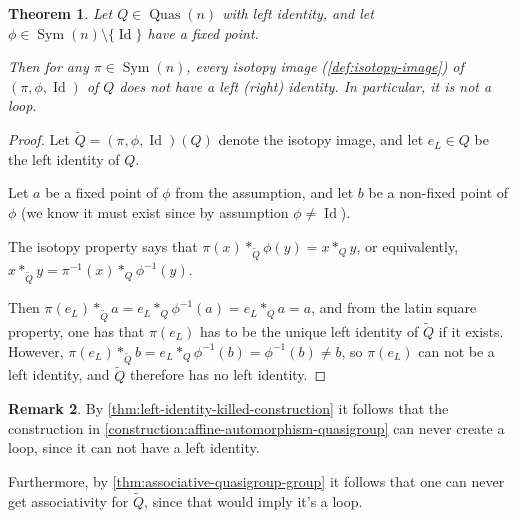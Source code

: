 \documentclass[a4paper, 12pt, english]{article}
\theoremstyle{plain}
\newtheorem{theorem}{Theorem}[section]
\theoremstyle{definition}
\newtheorem{remark}[theorem]{Remark}
\DeclareMathOperator{\Sym}{Sym}
\DeclareMathOperator{\Quas}{Quas}
\DeclareMathOperator{\Id}{Id}
\begin{document}
\begin{theorem} \label{thm:left-identity-killed-construction}
    Let \( Q \in \Quas(n) \) with left identity, and let \( \phi \in \Sym(n) \setminus \{\Id\} \) have a fixed point.

    Then for any \( \pi \in \Sym(n) \), every isotopy image (\autoref{def:isotopy-image}) of \( (\pi, \phi, \Id) \) of \( Q \) does \emph{not} have a left (right) identity. In particular, it is \emph{not} a loop.
\end{theorem}
\begin{proof}
    Let \( \tilde{Q} = (\pi, \phi, \Id)(Q) \) denote the isotopy image, and let \( e_L \in Q \) be the left identity of \( Q \). 
    
    Let \( a \) be a fixed point of \( \phi \) from the assumption, and let \( b \) be a non-fixed point of \( \phi \) (we know it must exist since by assumption \( \phi \neq \Id \)).

    The isotopy property says that \( \pi(x) *_{\tilde{Q}} \phi(y) = x *_Q y \), or equivalently, \( x *_{\tilde{Q}} y = \pi^{-1}(x) *_Q \phi^{-1}(y) \).

    Then \( \pi(e_L) *_{\tilde{Q}} a = e_L *_Q \phi^{-1}(a) = e_L *_Q a = a \), and from the latin square property, one has that \( \pi(e_L) \) has to be the unique left identity of \( \tilde{Q} \) if it exists. However, \( \pi(e_L) *_{\tilde{Q}} b = e_L *_Q \phi^{-1}(b) = \phi^{-1}(b) \neq b \), so \( \pi(e_L) \) can not be a left identity, and \( \tilde{Q} \) therefore has no left identity.
\end{proof}

\begin{remark}
    By \autoref{thm:left-identity-killed-construction} it follows that the construction in \autoref{construction:affine-automorphism-quasigroup} can never create a loop, since it can not have a left identity.

    Furthermore, by \autoref{thm:associative-quasigroup-group} it follows that one can never get associativity for \( \tilde{Q} \), since that would imply it's a loop.
\end{remark}
\end{document}
